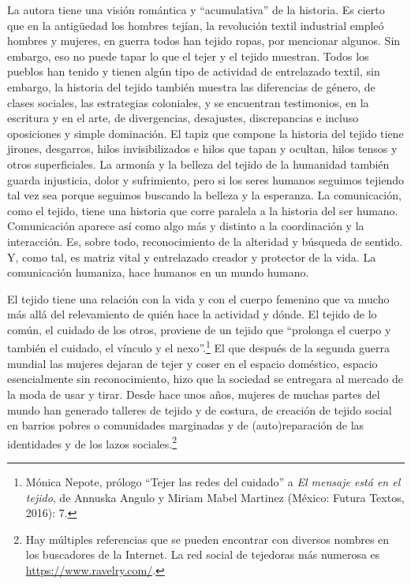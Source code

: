 \documentclass{tufte-handout}
\begin{document}
La autora tiene una visión romántica y ``acumulativa'' de la historia.
Es cierto que en la antigüedad los hombres tejían, la revolución textil
industrial empleó hombres y mujeres, en guerra todos han tejido ropas,
por mencionar algunos. Sin embargo, eso no puede tapar lo que el tejer y
el tejido muestran. Todos los pueblos han tenido y tienen algún tipo de
actividad de entrelazado textil, sin embargo, la historia del tejido
también muestra las diferencias de género, de clases sociales, las
estrategias coloniales, y se encuentran testimonios, en la escritura y
en el arte, de divergencias, desajustes, discrepancias e incluso
oposiciones y simple dominación. El tapiz que compone la historia del
tejido tiene jirones, desgarros, hilos invisibilizados e hilos que tapan
y ocultan, hilos tensos y otros superficiales. La armonía y la belleza
del tejido de la humanidad también guarda injusticia, dolor y
sufrimiento, pero si los seres humanos seguimos tejiendo tal vez sea
porque seguimos buscando la belleza y la esperanza. La comunicación,
como el tejido, tiene una historia que corre paralela a la historia del
ser humano. Comunicación aparece así como algo más y distinto a la
coordinación y la interacción. Es, sobre todo, reconocimiento de la
alteridad y búsqueda de sentido. Y, como tal, es matriz vital y
entrelazado creador y protector de la vida. La comunicación humaniza,
hace humanos en un mundo humano.

El tejido tiene una relación con la vida y con el cuerpo femenino que va
mucho más allá del relevamiento de quién hace la actividad y dónde. El
tejido de lo común, el cuidado de los otros, proviene de un tejido que
``prolonga el cuerpo y también el cuidado, el vínculo y el
nexo''.\footnote{Mónica Nepote, prólogo ``Tejer las redes del cuidado''
  a \emph{El mensaje está en el tejido}, de Annuska Angulo y Miriam
  Mabel Martinez (México: Futura Textos, 2016): 7.} El que después de la
segunda guerra mundial las mujeres dejaran de tejer y coser en el
espacio doméstico, espacio esencialmente sin reconocimiento, hizo que la
sociedad se entregara al mercado de la moda de usar y tirar. Desde hace
unos años, mujeres de muchas partes del mundo han generado talleres de
tejido y de costura, de creación de tejido social en barrios pobres o
comunidades marginadas y de (auto)reparación de las identidades y de los
lazos sociales.\footnote{Hay múltiples referencias que se pueden
  encontrar con diversos nombres en los buscadores de la Internet. La
  red social de tejedoras más numerosa es
  \url{https://www.ravelry.com/}.}
\end{document}
